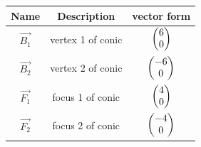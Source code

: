 \begin{tabular}{|c|c|c|}
\hline
\textbf{Name} & \textbf{Description} & \textbf{vector form} \\
\hline
$\vec{B_1}$ & vertex 1 of conic & $\begin{pmatrix}6\\0\end{pmatrix}$ \\ \hline
$\vec{B_2}$ & vertex 2 of conic & $\begin{pmatrix}-6\\0\end{pmatrix}$ \\ \hline
$\vec{F_1}$ & focus 1 of conic & $\begin{pmatrix}4\\0\end{pmatrix}$ \\ \hline
$\vec{F_2}$ & focus 2 of conic & $\begin{pmatrix}-4\\0\end{pmatrix}$ \\ \hline
\end{tabular}
